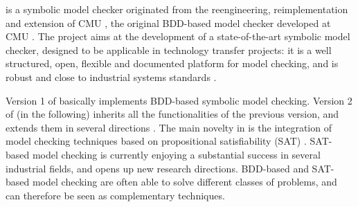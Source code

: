 \nusmv is a symbolic model checker originated from the
reengineering, reimplementation and extension of CMU \smv, the
original BDD-based model checker developed at CMU \cite{McMil93}.
The \nusmv project aims at the development of a state-of-the-art
symbolic model checker, designed to be applicable in technology
transfer projects: it is a well structured, open, flexible and
documented platform for model checking, and is robust and close to
industrial systems standards \cite{CCGR00}.

Version 1 of \nusmv basically implements BDD-based symbolic model checking.
Version 2 of \nusmv (\nusmvTwo in the following) 
inherits all the functionalities of the previous version, and extends them in
several directions \cite{CCG+02}.
The main novelty in \nusmvTwo is the integration of model checking
techniques based on propositional satisfiability (SAT) \cite{BCCZ99}.
SAT-based model checking is currently enjoying a substantial success
in several industrial fields, and opens up new research directions.
BDD-based and SAT-based model checking are often able to solve
different classes of problems, and can therefore be seen as
complementary techniques.

